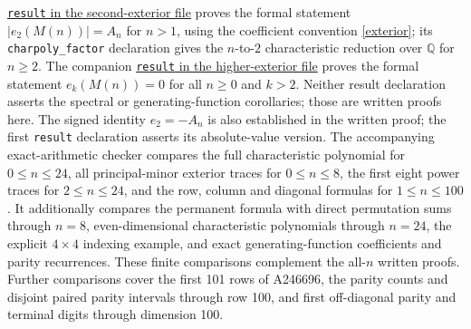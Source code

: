 \documentclass[11pt]{article}
\begin{document}
\href{https://github.com/the-omega-institute/trureturing/blob/d9bb8a406783c5222849b798f3c2ab738f653d75/D5/S3/Quantum/Matrix/SpeziaSerpentineSecondExteriorTrace.lean}{\texttt{result} in the second-exterior file}
proves the formal statement $|e_2(M(n))|=A_n$ for $n>1$, using the coefficient convention
\eqref{exterior}; its \texttt{charpoly\_factor} declaration gives the
$n$-to-$2$ characteristic reduction over $\mathbb Q$ for $n\geq2$.
The companion
\href{https://github.com/the-omega-institute/trureturing/blob/d9bb8a406783c5222849b798f3c2ab738f653d75/D5/S3/Quantum/Matrix/SpeziaSerpentineHigherExteriorTrace.lean}{\texttt{result} in the higher-exterior file}
proves the formal statement $e_k(M(n))=0$ for all $n\geq0$ and $k>2$.
Neither result declaration asserts the spectral or generating-function
corollaries; those are written proofs here. The signed identity $e_2=-A_n$
is also established in the written proof; the first \texttt{result}
declaration asserts its absolute-value version.
The accompanying exact-arithmetic checker compares the full characteristic
polynomial for $0\leq n\leq24$, all principal-minor exterior traces for
$0\leq n\leq8$, the first eight power traces for $2\leq n\leq24$,
and the row, column and diagonal formulas for $1\leq n\leq100$.
It additionally compares the permanent formula with direct permutation sums
through $n=8$, even-dimensional characteristic polynomials through $n=24$,
the explicit $4\times4$ indexing example, and exact generating-function
coefficients and parity recurrences. These finite comparisons complement
the all-$n$ written proofs. Further comparisons cover the first 101 rows
of A246696, the parity counts and disjoint paired parity intervals
through row 100, and first off-diagonal parity and terminal digits
through dimension 100.
\end{document}
